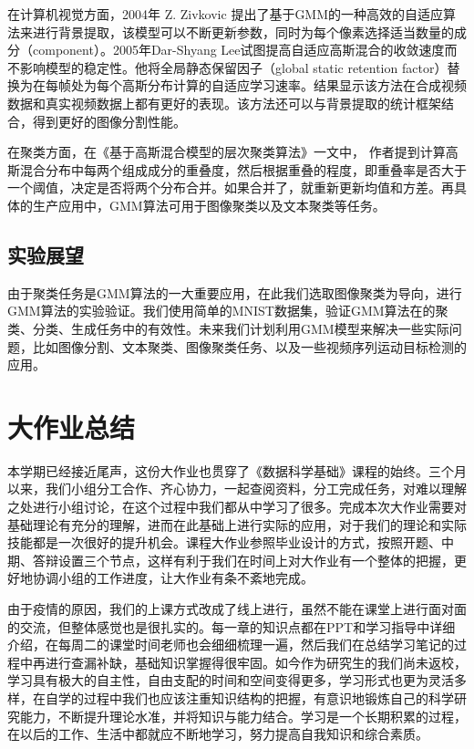 \documentclass[UTF8]{ctexart}
\begin{document}
在计算机视觉方面，2004年 Z. Zivkovic 提出了基于GMM的一种高效的自适应算法来进行背景提取，该模型可以不断更新参数，同时为每个像素选择适当数量的成分（component）。2005年Dar-Shyang Lee试图提高自适应高斯混合的收敛速度而不影响模型的稳定性。他将全局静态保留因子（global static retention factor）替换为在每帧处为每个高斯分布计算的自适应学习速率。结果显示该方法在合成视频数据和真实视频数据上都有更好的表现。该方法还可以与背景提取的统计框架结合，得到更好的图像分割性能。

在聚类方面，在《基于高斯混合模型的层次聚类算法》一文中， 作者提到计算高斯混合分布中每两个组成成分的重叠度，然后根据重叠的程度，即重叠率是否大于一个阈值，决定是否将两个分布合并。如果合并了，就重新更新均值和方差。再具体的生产应用中，GMM算法可用于图像聚类以及文本聚类等任务。

\subsection{实验展望}

由于聚类任务是GMM算法的一大重要应用，在此我们选取图像聚类为导向，进行GMM算法的实验验证。我们使用简单的MNIST数据集，验证GMM算法在的聚类、分类、生成任务中的有效性。未来我们计划利用GMM模型来解决一些实际问题，比如图像分割、文本聚类、图像聚类任务、以及一些视频序列运动目标检测的应用。

\section{大作业总结}

本学期已经接近尾声，这份大作业也贯穿了《数据科学基础》课程的始终。三个月以来，我们小组分工合作、齐心协力，一起查阅资料，分工完成任务，对难以理解之处进行小组讨论，在这个过程中我们都从中学习了很多。完成本次大作业需要对基础理论有充分的理解，进而在此基础上进行实际的应用，对于我们的理论和实际技能都是一次很好的提升机会。课程大作业参照毕业设计的方式，按照开题、中期、答辩设置三个节点，这样有利于我们在时间上对大作业有一个整体的把握，更好地协调小组的工作进度，让大作业有条不紊地完成。

由于疫情的原因，我们的上课方式改成了线上进行，虽然不能在课堂上进行面对面的交流，但整体感觉也是很扎实的。每一章的知识点都在PPT和学习指导中详细介绍，在每周二的课堂时间老师也会细细梳理一遍，然后我们在总结学习笔记的过程中再进行查漏补缺，基础知识掌握得很牢固。如今作为研究生的我们尚未返校，学习具有极大的自主性，自由支配的时间和空间变得更多，学习形式也更为灵活多样，在自学的过程中我们也应该注重知识结构的把握，有意识地锻炼自己的科学研究能力，不断提升理论水准，并将知识与能力结合。学习是一个长期积累的过程，在以后的工作、生活中都就应不断地学习，努力提高自我知识和综合素质。
\end{document}
